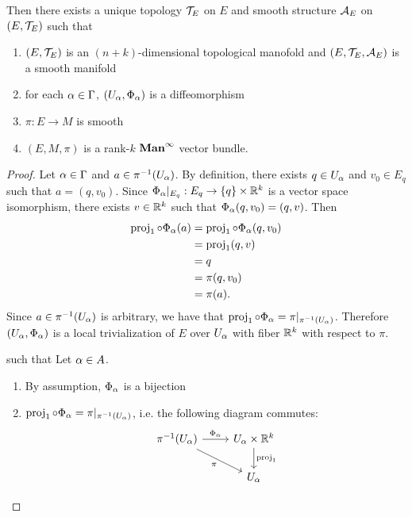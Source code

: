 \documentclass{book}
\begin{document}
\begin{ex}
\begin{enumerate}
	\end{enumerate}
	Then there exists a unique topology $\mathcal{T}_E$ on $E$ and smooth structure $\mathcal{A}_E$ on $(E, \mathcal{T}_E)$ such that 
	\begin{enumerate}
		\item $(E, \mathcal{T}_E)$ is an $(n+k)$-dimensional topological manofold and $(E, \mathcal{T}_E, \mathcal{A}_E)$ is a smooth manifold
		\item for each $\alpha \in \Gamma$, $(U_{\alpha}, \Phi_{\alpha})$ is a diffeomorphism
		\item $\pi:E \rightarrow M$ is smooth 
		\item $(E, M, \pi)$ is a rank-$k$ $\operatorname*{\text{\textbf{Man}}^{\infty}}$ vector bundle.
	\end{enumerate}
\end{ex}

\begin{proof}
	Let $\alpha \in \Gamma$ and $a \in \pi^{-1}(U_{\alpha})$. By definition, there exists $q \in U_{\alpha}$ and $v_0 \in E_q$ such that $a = (q, v_0)$. Since $\Phi_{\alpha}|_{E_q}: E_q \rightarrow \{q\} \times \mathbb{R}^k$ is a vector space isomorphism, there exists $v \in \mathbb{R}^k$ such that $\Phi_{\alpha}(q, v_0) = (q, v)$. Then 
	\begin{align*}
		\operatorname{\text{proj}}_1 \circ \Phi_{\alpha}(a)
		& = \operatorname{\text{proj}}_1 \circ \Phi_{\alpha}(q, v_0) \\
		& = \operatorname{\text{proj}}_1 (q, v) \\
		& = q \\
		& = \pi(q, v_0) \\
		& = \pi(a).
	\end{align*}
	Since $a \in \pi^{-1}(U_{\alpha})$ is arbitrary, we have that $\operatorname{\text{proj}}_1 \circ \Phi_{\alpha} = \pi|_{\pi^{-1}(U_{\alpha})}$.
	Therefore $(U_{\alpha}, \Phi_{\alpha})$ is a local trivialization of $E$ over $U_{\alpha}$ with fiber $\mathbb{R}^k$ with respect to $\pi$. 
	
	such that  Let $\alpha \in A$. 
	\begin{enumerate}
		\item By assumption, $\Phi_{\alpha}$ is a bijection
		\item $\operatorname{\text{proj}}_1 \circ \Phi_{\alpha} = \pi|_{\pi^{-1}(U_{\alpha})}$, i.e. the following diagram commutes:
		\[ 
		\begin{tikzcd}
			\pi^{-1}(U_{\al}) \arrow[r, "\Phi_{\al}"] \arrow[dr, "\pi"'] & U_{\al} \times \R^k \arrow[d, "\prj_1"]  \\
			& U_{\al}
		\end{tikzcd}
		\]
	\end{enumerate}
	

\end{proof}
\end{document}
